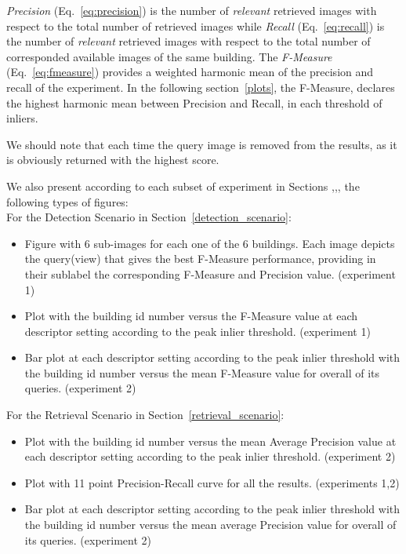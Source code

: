 \textit{Precision} (Eq.~\ref{eq:precision}) is the number of \textit{relevant} retrieved images with respect to the total number of 
retrieved images while \textit{Recall} (Eq.~\ref{eq:recall}) is the number of \textit{relevant} retrieved images with respect to the
total number of corresponded available images of the same building.
The \textit{F-Measure} (Eq.~\ref{eq:fmeasure})
provides a weighted harmonic mean of the precision and recall of the experiment.
In the following section~\ref{plots}, the F-Measure, declares the highest harmonic mean between Precision and Recall, in each threshold of inliers.

We should note that each time the query image is removed from the results, as it is obviously returned with the highest score.

We also present according to each subset of experiment in Sections \label{detection_exp1},\label{detection_exp2},\label{retrieval_exp1},\label{retrieval_exp2} the following types of figures:\\
For the Detection Scenario in Section~\ref{detection_scenario}:\\
\begin{itemize}
    \item Figure with 6 sub-images for each one of the 6 buildings. Each image depicts the query(view) that gives the best F-Measure performance, providing in their sublabel the corresponding F-Measure and Precision value. (experiment 1)
    \item Plot with the building id number versus the F-Measure value at each descriptor setting according to the peak inlier threshold. (experiment 1)
    \item Bar plot at each descriptor setting according to the peak inlier threshold with the building id number versus the mean F-Measure value for overall of its queries. (experiment 2)

\end{itemize}

For the Retrieval Scenario in Section~\ref{retrieval_scenario}: \\
\begin{itemize}
    \item Plot with the building id number versus the mean Average Precision value at each descriptor setting according to the peak inlier threshold. (experiment 2)
    \item Plot with 11 point Precision-Recall curve for all the results.  (experiments 1,2)
    \item Bar plot at each descriptor setting according to the peak inlier threshold with the building id number versus the mean average Precision value for overall of its queries. (experiment 2)    

\end{itemize}

